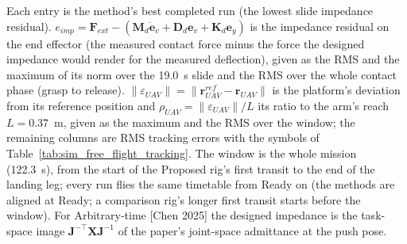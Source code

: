 \begin{table}[H]
\begin{threeparttable}
\begin{tablenotes}
\item[] Each entry is the method's best completed run (the lowest slide impedance residual). $e_{imp} = \boldsymbol{F}_{ext} - (\boldsymbol{M}_d \dot{\boldsymbol{e}}_v + \boldsymbol{D}_d \boldsymbol{e}_v + \boldsymbol{K}_d \boldsymbol{e}_y)$ is the impedance residual on the end effector (the measured contact force minus the force the designed impedance would render for the measured deflection), given as the RMS and the maximum of its norm over the 19.0~s slide and the RMS over the whole contact phase (grasp to release). $\|\varepsilon_{UAV}\| = \|\boldsymbol{r}_{UAV}^{ref} - \boldsymbol{r}_{UAV}\|$ is the platform's deviation from its reference position and $\rho_{UAV} = \|\varepsilon_{UAV}\|/L$ its ratio to the arm's reach $L = 0.37$~m, given as the maximum and the RMS over the window; the remaining columns are RMS tracking errors with the symbols of Table~\ref{tab:sim_free_flight_tracking}. The window is the whole mission (122.3~s), from the start of the Proposed rig's first transit to the end of the landing leg; every run flies the same timetable from Ready on (the methods are aligned at Ready; a comparison rig's longer first transit starts before the window). For Arbitrary-time [Chen 2025] the designed impedance is the task-space image $\boldsymbol{J}^{-\top}\boldsymbol{X}\boldsymbol{J}^{-1}$ of the paper's joint-space admittance at the push pose.
\end{tablenotes}
\end{threeparttable}
\end{table}
